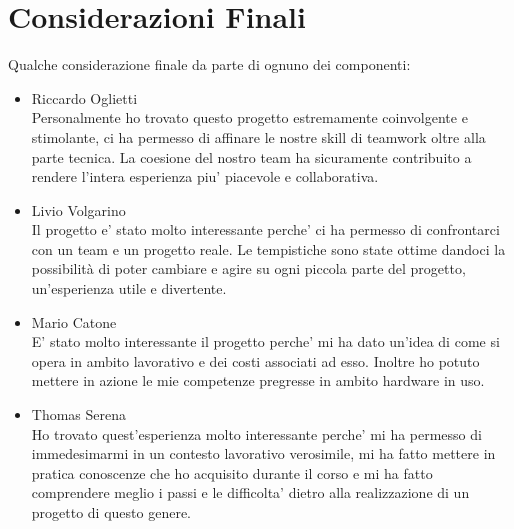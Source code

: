 \documentclass{report}
\begin{document}
	\chapter{Considerazioni Finali}
		Qualche considerazione finale da parte di ognuno dei componenti:
		\begin{itemize}
			\item Riccardo Oglietti\\
				Personalmente ho trovato questo progetto estremamente coinvolgente e stimolante, ci ha permesso di
				 affinare le nostre skill di teamwork oltre alla parte tecnica. La coesione del nostro team ha
				 sicuramente contribuito a rendere l'intera esperienza piu' piacevole e collaborativa.
			\item Livio Volgarino\\
				Il progetto e' stato molto interessante perche' ci ha permesso di confrontarci con un team e un progetto
				 reale. Le tempistiche sono state ottime dandoci la possibilità di poter cambiare e agire su ogni piccola
				 parte del progetto, un'esperienza utile e divertente. 
			\item Mario Catone\\
				E' stato molto interessante il progetto perche' mi ha dato un'idea di come si opera in ambito lavorativo
				 e dei costi associati ad esso. Inoltre ho potuto mettere in azione le mie competenze pregresse in
				 ambito hardware in uso.
			\item Thomas Serena\\
				Ho trovato quest'esperienza molto interessante perche' mi ha permesso di immedesimarmi in un contesto
				 lavorativo verosimile, mi ha fatto mettere in pratica conoscenze che ho acquisito durante il corso e
				 mi ha fatto comprendere meglio i passi e le difficolta' dietro alla realizzazione di un progetto di
				 questo genere.
		\end{itemize}
\end{document}
